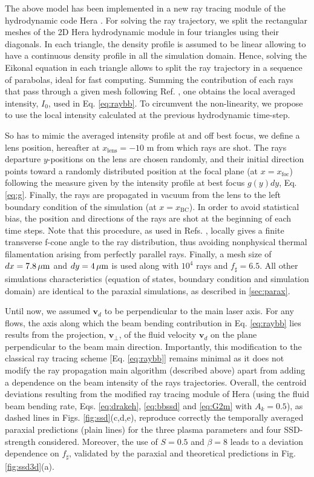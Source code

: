 \documentclass[%
 reprint,
 amsmath,amssymb,
 aps,
]{revtex4-1}
\begin{document}
The above model has been implemented in a new  ray  tracing module of the hydrodynamic code Hera \cite[]{HERA_Jourdren_2005,Loiseau_2006}.
For solving the ray trajectory, we split the rectangular meshes of the 2D Hera hydrodynamic module  in four triangles using their diagonals.  In each triangle, the density profile is assumed to be linear allowing to have a continuous density profile in all the simulation domain. 
Hence, solving the Eikonal equation  in each triangle allows to split the ray trajectory in a sequence of parabolas, ideal for fast computing. 
Summing the contribution of each rays that pass through a given mesh following Ref. \cite[]{POP_Debayle_2019}, one obtains the local averaged intensity, $ I_0$, used in Eq. \eqref{eq:raybb}. To circumvent the non-linearity, we propose to use the local intensity calculated at the previous hydrodynamic time-step.

So has to mimic the averaged intensity profile at and off best focus, we define a lens position, hereafter at $x_\mathrm{lens}=-10$ m from which rays are shot. 
The rays departure $y$-positions  on the lens are chosen randomly, and their initial direction points toward a randomly distributed  position at the focal plane (at $x=x_\mathrm{foc}$)  following the measure given by the intensity profile at best focus $g(y)dy$, Eq. \eqref{eq:g}. 
Finally, the rays are propagated  in vacuum from the lens to the left boundary condition  of the simulation (at $x=x_\mathrm{BC}$).
In order to avoid statistical bias, the position and directions of the rays are shot at the beginning of each time steps. 
Note that this procedure, as used in Refs.  \cite[]{Lefebvre_2018}, locally gives a  finite   transverse f-cone angle to the ray distribution, thus avoiding nonphysical thermal filamentation  arising from perfectly parallel  rays.
Finally, a mesh size of   $dx = 7.8\, \rm \mu m$ and   $dy =4\, \rm \mu m$ is used along with  $10^4$ rays and $f_\sharp=6.5$. All other simulations characteristics (equation of states, boundary condition and simulation domain) are identical to the paraxial simulations, as described in \ref{sec:parax}.

Until now, we assumed  $\mathbf{v}_d$ to be perpendicular to the main laser axis. For any flows, the axis along which the beam bending contribution in Eq. \eqref{eq:raybb}  lies results from the projection,  $\mathbf{v}_\perp$, of the fluid velocity $\mathbf{v}_d$ on the plane perpendicular to the beam main direction. 
Importantly, this modification to the classical ray tracing scheme [Eq. \eqref{eq:raybb}] remains minimal as it does not modify the  ray propagation main algorithm (described above) apart from adding a dependence on the beam intensity of the rays trajectories. 
Overall, the centroid deviations resulting from the modified ray tracing  module of Hera (using the fluid beam bending rate, Eqs. \eqref{eq:drakeh}, \eqref{eq:bbssd}  and \eqref{eq:G2m} with $A_k=0.5$), as dashed lines in Figs. \ref{fig:ssd}(c,d,e), reproduce correctly the temporally averaged paraxial predictions (plain lines)  for the three plasma parameters and four SSD-strength considered. Moreover,  the use of $S=0.5$ and $\beta=8$ leads to a deviation dependence on $f_\sharp$, validated by the paraxial and theoretical  predictions in Fig. \ref{fig:ssd3d}(a). 
\end{document}
